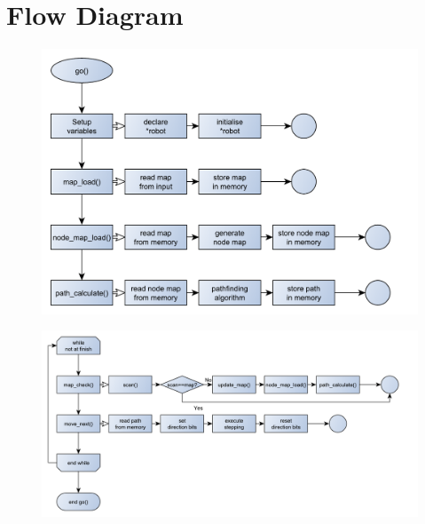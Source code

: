\chapter{Flow Diagram}

\begin{figure}[h!]
    \centering
    \includegraphics[height=0.8\textwidth,angle=90]{figures/app_general/flowchart1}
\end{figure}
\begin{figure}[h!]
    \centering
    \includegraphics[height=0.8\textwidth,angle=90]{figures/app_general/flowchart2}
\end{figure}
